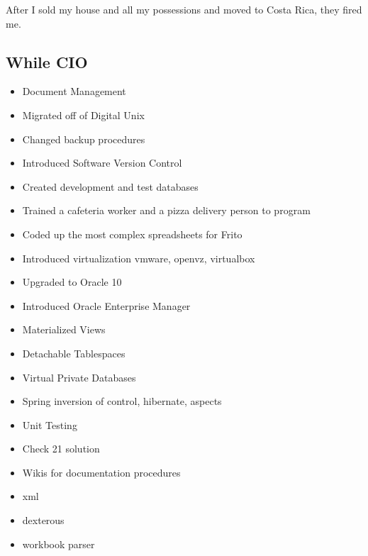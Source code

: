 \documentclass[letterpaper,10pt,english]{sphinxmanual}
\begin{document}
After I sold my house and all my possessions and moved to Costa Rica, they fired me.


\subsection{While CIO}
\label{\detokenize{Contributions:while-cio}}\begin{itemize}
\item {} 
Document Management

\item {} 
Migrated off of Digital Unix

\item {} 
Changed backup procedures

\item {} 
Introduced Software Version Control

\item {} 
Created development and test databases

\item {} 
Trained a cafeteria worker and a pizza delivery person to program

\item {} 
Coded up the most complex spreadsheets for Frito

\item {} 
Introduced virtualization vmware, openvz, virtualbox

\item {} 
Upgraded to Oracle 10

\item {} 
Introduced Oracle Enterprise Manager

\item {} 
Materialized Views

\item {} 
Detachable Tablespaces

\item {} 
Virtual Private Databases

\item {} 
Spring inversion of control, hibernate, aspects

\item {} 
Unit Testing

\item {} 
Check 21 solution

\item {} 
Wikis for documentation procedures

\item {} 
xml

\item {} 
dexterous

\item {} 
workbook parser

\end{itemize}
\end{document}
